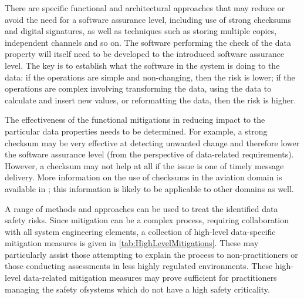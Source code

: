 There are specific functional and architectural approaches that may reduce or avoid the need for a \gls{software assurance level}, including use of strong checksums and digital signatures, as well as techniques such as storing multiple copies, independent channels and so on. The software performing the check of the \gls{data property} will itself need to be developed to the introduced \gls{software assurance level}. The key is to establish what the software in the system is doing to the data: if the operations are simple and non-changing, then the risk is lower; if the operations are complex involving transforming the data, using the data to calculate and insert new values, or reformatting the data, then the risk is higher.

The effectiveness of the functional \glspl{mitigation} in reducing impact to the particular data properties needs to be determined. For example, a strong checksum may be very effective at detecting unwanted change and therefore lower the \gls{software assurance level} (from the perspective of data-related requirements). However, a checksum may not help at all if the issue is one of timely message delivery. More \gls{information} on the use of checksums in the aviation domain is available in \cite{citation:koopman2015selection}; this \gls{information} is likely to be applicable to other domains as well.

A range of methods and approaches can be used to treat the identified data safety risks. Since \gls{mitigation} can be a complex process, requiring collaboration with all system engineering elements, a collection of high-level data-specific \gls{mitigation} measures is given in \autoref{tab:HighLevelMitigations}. These may particularly assist those attempting to explain the process to non-practitioners or those conducting assessments in less highly regulated environments. These high-level data-related \gls{mitigation} measures may prove sufficient for practitioners \cbstart managing the safety of\cbend systems which do not have a high safety criticality.

